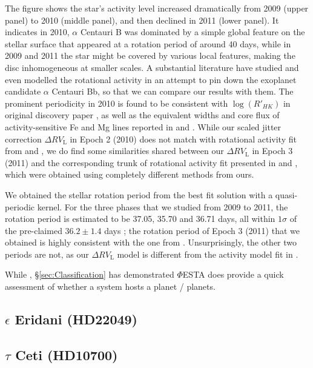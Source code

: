 The figure shows the star's activity level increased dramatically from 2009 (upper panel) to 2010 (middle panel), and then declined in 2011 (lower panel). It indicates in 2010, $\alpha$ Centauri B was dominated by a simple global feature on the stellar surface that appeared at a rotation period of around 40 days, while in 2009 and 2011 the star might be covered by various local features, making the disc inhomogeneous at smaller scales. A substantial literature have studied and even modelled the rotational activity in an attempt to pin down the exoplanet candidate $\alpha$ Centauri Bb, so that we can compare our results with them. The prominent periodicity in 2010 is found to be consistent with $\log (R'_{HK})$ in original discovery paper \cite{Dumusque_Centauri_B}, as well as the equivalent widths and core flux of activity-sensitive Fe and Mg lines reported in \cite{Thompson2017MNRAS} and \cite{Wise2018}. While our scaled jitter correction $\Delta RV_\text{L}$ in Epoch 2 (2010) does not match with rotational activity fit from \cite{Dumusque_Centauri_B} and \cite{Hatzes2013}, we do find some similarities shared between our $\Delta RV_\text{L}$ in Epoch 3 (2011) and the corresponding trunk of rotational activity fit presented in \cite{Dumusque_Centauri_B} and \cite{Hatzes2013}, which were obtained using completely different methods from ours. 

We obtained the stellar rotation period from the best fit solution with a quasi-periodic kernel. For the three phases that we studied from 2009 to 2011, the rotation period is estimated to be 37.05, 35.70 and 36.71 days, all within $1\sigma$ of the pre-claimed $36.2\pm1.4$ days \cite{DeWarf2010}; the rotation period of Epoch 3 (2011) that we obtained is highly consistent with the one from \cite{Dumusque_Centauri_B}. Unsurprisingly, the other two periods are not, as our $\Delta RV_\text{L}$ model is  different from the activity model fit in \cite{Dumusque_Centauri_B}. 

While , \S\ref{sec:Classification} has demonstrated $\mathit{\Phi}$ESTA does provide a quick assessment of whether a system hosts a planet / planets. 





\subsection{$\epsilon$ Eridani (HD22049)}

\subsection{$\tau$ Ceti (HD10700)}

